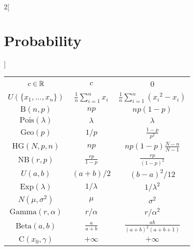 \documentclass[../../../main.tex]{subfiles}
\begin{document}
\begin{multicols}{2}[\section{Probability}]
\begin{center}
\begin{tabular}{|c|c|c|}
      \hline
      $c\in\mathbb{R}$                & $\displaystyle c$              & 0                                           \\
      $U(\{x_1,\ldots,x_n\})$  & $\frac{1}{n}\sum_{i=1}^n x_i$  & $\frac{1}{n}\sum_{i=1}^n ({x_i}^2-x_i)$     \\
      $\text{B}(n,p)$          & $\displaystyle np$             & $\displaystyle np(1-p)$                     \\
      $\text{Pois}(\lambda)$   & $\displaystyle \lambda$        & $\displaystyle \lambda$                     \\
      $\text{Geo}(p)$          & $\displaystyle 1/p$            & $\displaystyle \frac{1-p}{p^2}$             \\
      $\text{HG}(N,p,n)$       & $\displaystyle np$             & $\displaystyle np(1-p)\frac{N-n}{N-1}$      \\
      $\text{NB}(r,p)$         & $\displaystyle \frac{rp}{1-p}$ & $\displaystyle \frac{rp}{{(1-p)}^2}$        \\
      $U(a,b)$                 & $\displaystyle (a+b)/2$        & $\displaystyle {(b-a)}^2/12$                \\
      $\text{Exp}(\lambda)$    & $\displaystyle 1/\lambda$      & $\displaystyle 1/\lambda^2$                 \\
      $N(\mu,\sigma^2)$        & $\displaystyle \mu$            & $\displaystyle \sigma^2$                    \\
      $\text{Gamma}(r,\alpha)$ & $\displaystyle r/\alpha$       & $\displaystyle r/\alpha^2$                  \\
      $\text{Beta}(a,b)$       & $\displaystyle \frac{a}{a+b}$  & $\displaystyle \frac{ab}{{(a+b)}^2(a+b+1)}$ \\
      $\text{C}(x_0,\gamma)$   & $\displaystyle +\infty$        & $\displaystyle +\infty$                     \\
      \hline
    \end{tabular}
  \end{center}
\end{multicols}
\end{document}
